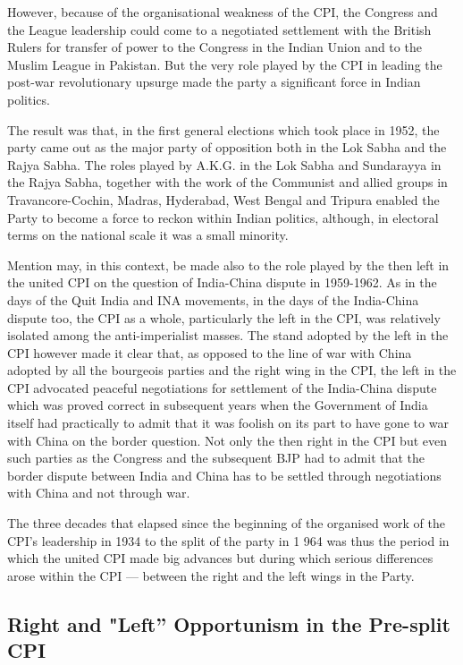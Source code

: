 However, because of the organisational weakness of the CPI, the Congress and the League leadership could come to a negotiated settlement with the British Rulers for transfer of power to the Congress in the Indian Union and to the Muslim League in Pakistan. But the very role played by the CPI in leading the post-war revolutionary upsurge made the party a significant force in Indian politics. 

The result was that, in the first general elections which took place in 1952, the party came out as the major party of opposition both in the Lok Sabha and the Rajya Sabha. The roles played by A.K.G. in the Lok Sabha and Sundarayya in the Rajya Sabha, together with the work of the Communist and allied groups in Travancore-Cochin, Madras, Hyderabad, West Bengal and Tripura enabled the Party to become a force to reckon within Indian politics, although, in electoral terms on the national scale it was a small minority. 

Mention may, in this context, be made also to the role played by the then left in the united CPI on the question of India-China dispute in 1959-1962. As in the days of the Quit India and INA movements, in the days of the India-China dispute too, the CPI as a whole, particularly the left in the CPI, was relatively isolated among the anti-imperialist masses. The stand adopted by the left in the CPI however made it clear that, as opposed to the line of war with China adopted by all the bourgeois parties and the right wing in the CPI, the left in the CPI advocated peaceful negotiations for settlement of the India-China dispute which was proved correct in subsequent years when the Government of India itself had practically to admit that it was foolish on its part to have gone to war with China on the border question. Not only the then right in the CPI but even such parties as the Congress and the subsequent BJP had to admit that the border dispute between India and China has to be settled through negotiations with China and not through war. 

The three decades that elapsed since the beginning of the organised work of the CPI’s leadership in 1934 to the split of the party in 1 964 was thus the period in which the united CPI made big advances but during which serious differences arose within the CPI — between the right and the left wings in the Party. 


\subsection{Right and "Left” Opportunism in the Pre-split CPI}


